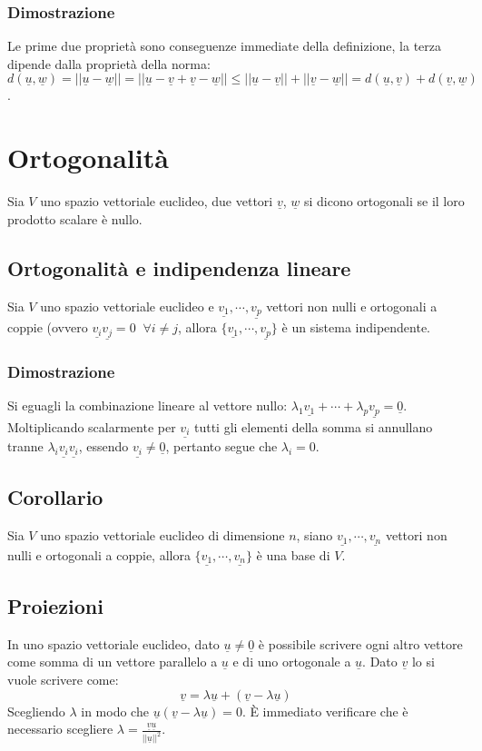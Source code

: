 \subsubsection{Dimostrazione}
Le prime due propriet\`a sono conseguenze immediate della definizione, la terza dipende dalla propriet\`a della norma: $d(\underline{u},\underline{w})=||\underline{u}-
\underline{w}||=||\underline{u}-\underline{v}+\underline{v}-\underline{w}||\le||\underline{u}-\underline{v}||+||\underline{v}-\underline{w}||=d(\underline{u},\underline{v})+
d(\underline{v},\underline{w})$.
\section{Ortogonalit\`a}
Sia $V$ uno spazio vettoriale euclideo, due vettori $\underline{v}$, $\underline{w}$ si dicono ortogonali se il loro prodotto scalare \`e nullo.
\subsection{Ortogonalit\`a e indipendenza lineare}
Sia $V$ uno spazio vettoriale euclideo e $\underline{v_1},\cdots,\underline{v_p}$ vettori non nulli e ortogonali a coppie (ovvero $\underline{v_i}\underline{v_j}=0\;\;\forall i
\neq j$, allora $\{\underline{v_1},\cdots,\underline{v_p}\}$ \`e un sistema indipendente.
\subsubsection{Dimostrazione}
Si eguagli la combinazione lineare al vettore nullo: $\lambda_1\underline{v_1}+\cdots+\lambda_p\underline{v_p}=\underline{0}$. Moltiplicando scalarmente per $\underline{v_i}$ 
tutti gli elementi della somma si annullano tranne $\lambda_i\underline{v_i}\underline{v_i}$, essendo $\underline{v_i}\neq\underline{0}$, pertanto segue che $\lambda_i=0$.
\subsection{Corollario}
Sia $V$ uno spazio vettoriale euclideo di dimensione $n$, siano $\underline{v_1},\cdots,\underline{v_n}$ vettori non nulli e ortogonali a coppie, allora $\{\underline{v_1},
\cdots,\underline{v_n}\}$ \`e una base di $V$.
\subsection{Proiezioni}
In uno spazio vettoriale euclideo, dato $\underline{u}\neq\underline{0}$ \`e possibile scrivere ogni altro vettore come somma di un vettore parallelo a $\underline{u}$ e di uno 
ortogonale a $\underline{u}$. Dato $\underline{v}$ lo si vuole scrivere come:
\begin{equation}
\underline{v}=\lambda\underline{u}+(\underline{v}-\lambda\underline{u})
\end{equation}
Scegliendo $\lambda$ in modo che $\underline{u}(\underline{v}-\lambda\underline{u})=0$. \`E immediato verificare che \`e necessario scegliere $\lambda=\frac{\underline{v}
\underline{u}}{||\underline{u}||^2}$.
